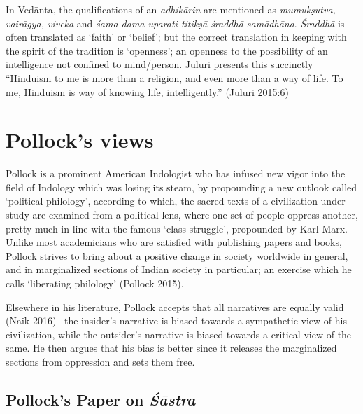 In Vedānta, the qualiﬁcations of an {\sl adhikārin} are mentioned as {\sl mumukṣutva, vairāgya, viveka} and {\sl śama-dama-uparati-titikṣā-śraddhā-samādhāna}. {\sl Śraddhā} is often translated as `faith' or `belief'; but the correct translation in keeping with the spirit of the tradition is `openness'; an openness to the possibility of an intelligence not conﬁned to mind/person. Juluri presents this succinctly ``Hinduism to me is more than a religion, and even more than a way of life. To me, Hinduism is way of knowing life, intelligently.'' (Juluri 2015:6)

\section{Pollock's views}\label{art12-sec3}

Pollock is a prominent American Indologist who has infused new vigor into the ﬁeld of Indology which was losing its steam, by propounding a new outlook called `political philology', according to which, the sacred texts of a civilization under study are examined from a political lens, where one set of people oppress another, pretty much in line with the famous `class-struggle', propounded by Karl Marx. Unlike most academicians who are satisﬁed with publishing papers and books, Pollock strives to bring about a positive change in society worldwide in general, and in marginalized sections of Indian society in particular; an exercise which he calls `liberating philology' (Pollock 2015).

Elsewhere in his literature, Pollock accepts that all narratives are equally valid (Naik 2016) --the insider's narrative is biased towards a sympathetic view of his civilization, while the outsider's narrative is biased towards a critical view of the same. He then argues that his bias is better since it releases the marginalized sections from oppression and sets them free.

\subsection{Pollock's Paper on {{\sl\bfseries Śāstra}\relax}}\label{art12-sec3.1}

